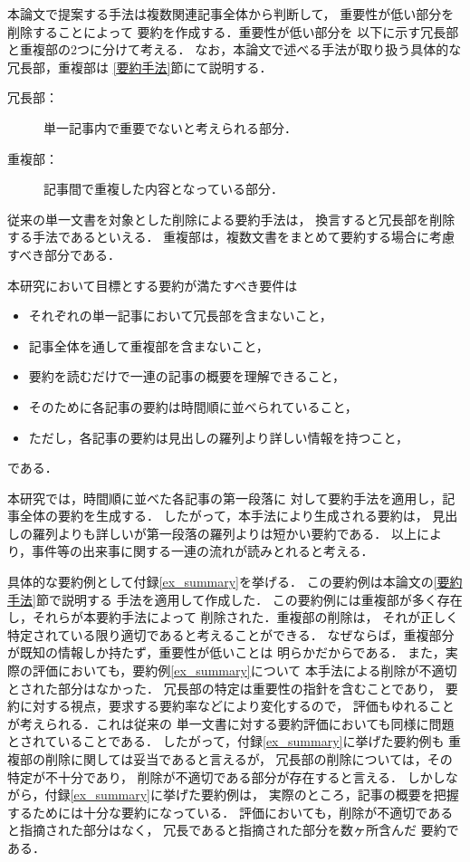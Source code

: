 本論文で提案する手法は複数関連記事全体から判断して，
重要性が低い部分を削除することによって
要約を作成する．重要性が低い部分を
以下に示す冗長部と重複部の2つに分けて考える．
なお，本論文で述べる手法が取り扱う具体的な冗長部，重複部は
\ref{要約手法}節にて説明する．

\begin{description}
 \item[冗長部：] 単一記事内で重要でないと考えられる部分．
 \item[重複部：] 記事間で重複した内容となっている部分．
\end{description}
従来の単一文書を対象とした削除による要約手法は，
換言すると冗長部を削除する手法であるといえる．
重複部は，複数文書をまとめて要約する場合に考慮すべき部分である．

本研究において目標とする要約が満たすべき要件は
\begin{itemize}
 \item それぞれの単一記事において冗長部を含まないこと，
 \item 記事全体を通して重複部を含まないこと，
 \item 要約を読むだけで一連の記事の概要を理解できること，
 \item そのために各記事の要約は時間順に並べられていること，
 \item ただし，各記事の要約は見出しの羅列より詳しい情報を持つこと，
\end{itemize}
である．

本研究では，時間順に並べた各記事の第一段落に
対して要約手法を適用し，記事全体の要約を生成する．
したがって，本手法により生成される要約は，
見出しの羅列よりも詳しいが第一段落の羅列よりは短かい要約である．
以上により，事件等の出来事に関する一連の流れが読みとれると考える．

具体的な要約例として付録\ref{ex_summary}を挙げる．
この要約例は本論文の\ref{要約手法}節で説明する
手法を適用して作成した．
この要約例には重複部が多く存在し，それらが本要約手法によって
削除された．重複部の削除は，
それが正しく特定されている限り適切であると考えることができる．
なぜならば，重複部分が既知の情報しか持たず，重要性が低いことは
明らかだからである．
また，実際の評価においても，要約例\ref{ex_summary}について
本手法による削除が不適切とされた部分はなかった．
冗長部の特定は重要性の指針を含むことであり，
要約に対する視点，要求する要約率などにより変化するので，
評価もゆれることが考えられる．これは従来の
単一文書に対する要約評価においても同様に問題とされていることである．
したがって，付録\ref{ex_summary}に挙げた要約例も
重複部の削除に関しては妥当であると言えるが，
冗長部の削除については，その特定が不十分であり，
削除が不適切である部分が存在すると言える．
しかしながら，付録\ref{ex_summary}に挙げた要約例は，
実際のところ，記事の概要を把握するためには十分な要約になっている．
評価においても，削除が不適切であると指摘された部分はなく，
冗長であると指摘された部分を数ヶ所含んだ
要約である．

